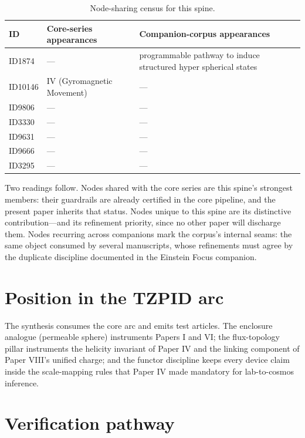 \documentclass[11pt]{article}
\theoremstyle{remark}
\begin{document}
\begin{table}[ht]
\centering
\small
\caption{Node-sharing census for this spine.}
\label{tab:crosswalk}
\begin{tabular}{lp{4.4cm}p{6.6cm}}
\toprule
ID & Core-series appearances & Companion-corpus appearances \\
\midrule
ID1874 & --- & programmable pathway to induce structured hyper spherical states \\
ID10146 & IV (Gyromagnetic Movement) & --- \\
ID9806 & --- & --- \\
ID3330 & --- & --- \\
ID9631 & --- & --- \\
ID9666 & --- & --- \\
ID3295 & --- & --- \\
\bottomrule
\end{tabular}
\end{table}

Two readings follow. Nodes shared with the core series are this spine's strongest members: their guardrails are already certified in the core pipeline, and the present paper inherits that status. Nodes unique to this spine are its distinctive contribution---and its refinement priority, since no other paper will discharge them. Nodes recurring across companions mark the corpus's internal seams: the same object consumed by several manuscripts, whose refinements must agree by the duplicate discipline documented in the Einstein Focus companion.

\section{Position in the TZPID arc}
\label{sec:arc}

The synthesis consumes the core arc and emits test articles. The enclosure analogue (permeable sphere) instruments Papers I and VI; the flux-topology pillar instruments the helicity invariant of Paper IV and the linking component of Paper VIII's unified charge; and the functor discipline keeps every device claim inside the scale-mapping rules that Paper IV made mandatory for lab-to-cosmos inference.

\section{Verification pathway}
\label{sec:verify}
\end{document}
